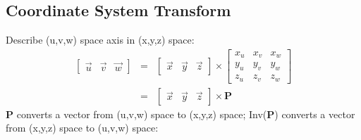 \documentclass[12pt]{article}
\begin{document}
    \subsection{Coordinate System Transform}
        Describe (u,v,w) space axis in (x,y,z) space:
        \begin{eqnarray*}
            \left[ \begin{array}{ccc} \overrightarrow{u} & \overrightarrow{v} & \overrightarrow{w} \end{array} \right] &
            = &
            \left[ \begin{array}{ccc} \overrightarrow{x} & \overrightarrow{y} & \overrightarrow{z} \end{array} \right]
            \times
            \left[ \begin{array}{ccc}
                x_u & x_v & x_w \\
                y_u & y_v & y_w \\
                z_u & z_v & z_w
            \end{array} \right] \\
            & = &
            \left[ \begin{array}{ccc} \overrightarrow{x} & \overrightarrow{y} & \overrightarrow{z} \end{array} \right]
            \times
            \textbf{P}
        \end{eqnarray*}
        \textbf{P} converts a vector from (u,v,w) space to (x,y,z) space; Inv(\textbf{P})
        converts a vector from (x,y,z) space to (u,v,w) space:
\end{document}
